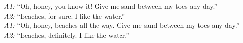 \begin{tcolorbox}
\textit{A1:} ``Oh, honey, you know it! Give me sand between my toes any day.''\\[-2pt]
\textit{A2:} ``Beaches, for sure. I like the water.''\\[-2pt]
\textit{A1:} ``Oh, honey, beaches all the way. Give me sand between my toes any day.''\\[-2pt]
\textit{A2:} ``Beaches, definitely. I like the water.''

\end{tcolorbox}
